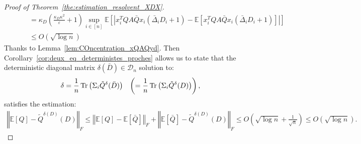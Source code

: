 \documentclass[a4papaer, titlepage]{book}
\begin{document}
\begin{proof}[Proof of Theorem~\ref{the:estimation_resolvent_XDX}]
\begin{align*}
    &\hspace{1cm}= \kappa_D \left( \frac{\kappa_D\kappa^2}{\varepsilon} + 1 \right)\sup_{i\in [n]} \mathbb E \left[ \left\vert x_i^T QA \bar Q x_i \left( \bar \Delta_i D_i + 1 \right) - \mathbb E \left[ x_i^T QA \bar Q x_i \left( \bar \Delta_i D_i + 1 \right) \right] \right\vert  \right]\\
    &\hspace{1cm}\leq O \left(\sqrt{\log n} \right)
  \end{align*}
  Thanks to Lemma~\ref{lem:COncentration_xQAQyd}. 
  Then Corollary~\ref{cor:deux_eq_deterministes_proches} allows us to state that the deterministic diagonal matrix $\delta(\bar D) \in \mathcal D_n$ solution to:
  \begin{align*}
    \delta = \frac{1}{n} \operatorname{Tr} \left( \Sigma_i \tilde Q^\delta(\bar D) \right)&
    & \left( = \frac{1}{n} \operatorname{Tr} \left( \Sigma_i \tilde Q^\delta(D) \right) \right),
  \end{align*}
  satisfies the estimation:
  \begin{align*}
    \left\Vert \mathbb E[ Q] - \tilde Q^{\delta(D)}(D) \right\Vert_F
    \leq \left\Vert \mathbb E[ Q] -  \mathbb E[ \bar Q] \right\Vert_F+\left\Vert \mathbb E[\bar Q] - \tilde Q^{\delta(D)}(D) \right\Vert_F
    \leq O \left( \sqrt{\log n} + \frac{1}{\sqrt n}   \right)
    \leq O \left( \sqrt{\log n}\right).
  \end{align*}

  
\end{proof}
\end{document}
